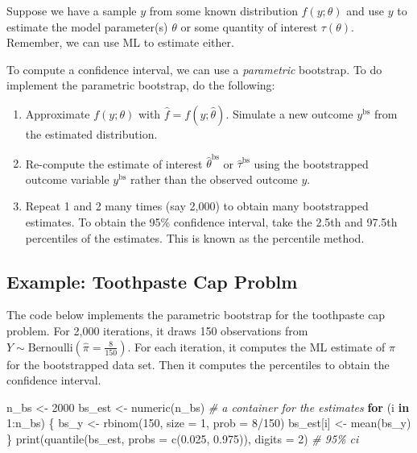\documentclass[
]{book}
\newenvironment{Shaded}{\begin{snugshade}}{\end{snugshade}}
\newcommand{\AttributeTok}[1]{\textcolor[rgb]{0.77,0.63,0.00}{#1}}
\newcommand{\CommentTok}[1]{\textcolor[rgb]{0.56,0.35,0.01}{\textit{#1}}}
\newcommand{\ControlFlowTok}[1]{\textcolor[rgb]{0.13,0.29,0.53}{\textbf{#1}}}
\newcommand{\DecValTok}[1]{\textcolor[rgb]{0.00,0.00,0.81}{#1}}
\newcommand{\FloatTok}[1]{\textcolor[rgb]{0.00,0.00,0.81}{#1}}
\newcommand{\FunctionTok}[1]{\textcolor[rgb]{0.00,0.00,0.00}{#1}}
\newcommand{\NormalTok}[1]{#1}
\newcommand{\OtherTok}[1]{\textcolor[rgb]{0.56,0.35,0.01}{#1}}
\newcommand{\SpecialCharTok}[1]{\textcolor[rgb]{0.00,0.00,0.00}{#1}}
\providecommand{\tightlist}{%
  \setlength{\itemsep}{0pt}\setlength{\parskip}{0pt}}
\begin{document}
Suppose we have a sample \(y\) from some known distribution \(f(y; \theta)\) and use \(y\) to estimate the model parameter(s) \(\theta\) or some quantity of interest \(\tau(\theta)\). Remember, we can use ML to estimate either.

To compute a confidence interval, we can use a \emph{parametric} bootstrap. To do implement the parametric bootstrap, do the following:

\begin{enumerate}
\def\labelenumi{\arabic{enumi}.}
\tightlist
\item
  Approximate \(f(y; \theta)\) with \(\hat{f} = f(y; \hat{\theta})\). Simulate a new outcome \(y^{\text{bs}}\) from the estimated distribution.
\item
  Re-compute the estimate of interest \(\hat{\theta}^{\text{bs}}\) or \(\hat{\tau}^{\text{bs}}\) using the bootstrapped outcome variable \(y^{\text{bs}}\) rather than the observed outcome \(y\).
\item
  Repeat 1 and 2 many times (say 2,000) to obtain many bootstrapped estimates. To obtain the 95\% confidence interval, take the 2.5th and 97.5th percentiles of the estimates. This is known as the percentile method.
\end{enumerate}

\hypertarget{example-toothpaste-cap-problm}{%
\subsection{Example: Toothpaste Cap Problm}\label{example-toothpaste-cap-problm}}

The code below implements the parametric bootstrap for the toothpaste cap problem. For 2,000 iterations, it draws 150 observations from \(Y \sim \text{Bernoulli}(\hat{\pi} = \frac{8}{150})\). For each iteration, it computes the ML estimate of \(\pi\) for the bootstrapped data set. Then it computes the percentiles to obtain the confidence interval.

\begin{Shaded}
\begin{Highlighting}[]
\NormalTok{n\_bs }\OtherTok{\textless{}{-}} \DecValTok{2000}
\NormalTok{bs\_est }\OtherTok{\textless{}{-}} \FunctionTok{numeric}\NormalTok{(n\_bs)  }\CommentTok{\# a container for the estimates}
\ControlFlowTok{for}\NormalTok{ (i }\ControlFlowTok{in} \DecValTok{1}\SpecialCharTok{:}\NormalTok{n\_bs) \{}
\NormalTok{  bs\_y }\OtherTok{\textless{}{-}} \FunctionTok{rbinom}\NormalTok{(}\DecValTok{150}\NormalTok{, }\AttributeTok{size =} \DecValTok{1}\NormalTok{, }\AttributeTok{prob =} \DecValTok{8}\SpecialCharTok{/}\DecValTok{150}\NormalTok{)}
\NormalTok{  bs\_est[i] }\OtherTok{\textless{}{-}} \FunctionTok{mean}\NormalTok{(bs\_y)}
\NormalTok{\}}
\FunctionTok{print}\NormalTok{(}\FunctionTok{quantile}\NormalTok{(bs\_est, }\AttributeTok{probs =} \FunctionTok{c}\NormalTok{(}\FloatTok{0.025}\NormalTok{, }\FloatTok{0.975}\NormalTok{)), }\AttributeTok{digits =} \DecValTok{2}\NormalTok{)  }\CommentTok{\# 95\% ci}
\end{Highlighting}
\end{Shaded}
\end{document}
